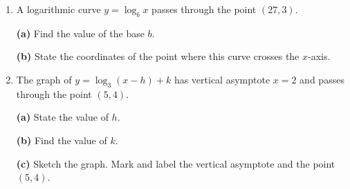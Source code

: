 \documentclass[12pt, twoside]{article}
\begin{document}
\begin{enumerate}[itemsep=0.5cm]
\newpage

\item[4.] A logarithmic curve $y = \log_b x$ passes through the point
$(27, 3)$.

\textbf{(a)} Find the value of the base $b$.

\vspace{2.2cm}

\textbf{(b)} State the coordinates of the point where this curve crosses
the $x$-axis.

\vspace{1.8cm}

\item[5.] The graph of $y = \log_3(x - h) + k$ has vertical asymptote
$x = 2$ and passes through the point $(5, 4)$.

\textbf{(a)} State the value of $h$.

\vspace{1cm}

\textbf{(b)} Find the value of $k$.

\vspace{2.2cm}

\textbf{(c)} Sketch the graph. Mark and label the vertical
asymptote and the point $(5, 4)$.

\begin{center}
\end{center}

\end{enumerate}
\end{document}
